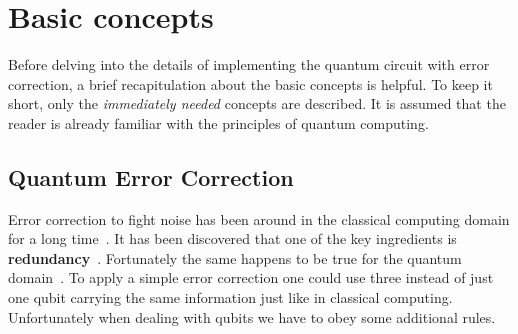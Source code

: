 \section{Basic concepts}
\label{sec:basic-concepts}

Before delving into the details of implementing the quantum circuit with error correction, a brief recapitulation about the basic concepts is helpful.
To keep it short, only the \emph{immediately needed} concepts are described.
It is assumed that the reader is already familiar with the principles of quantum computing.

\subsection{Quantum Error Correction}
\label{subsec:qec}

Error correction to fight noise has been around in the classical computing domain for a long time~\cite[p. 459]{benenti2004principles}.
It has been discovered that one of the key ingredients is \textbf{redundancy}~\cite[p. 459]{benenti2004principles}.
Fortunately the same happens to be true for the quantum domain~\cite[p. 46998]{Li}.
To apply a simple error correction one could use three instead of just one qubit carrying the same information just like in classical computing.
Unfortunately when dealing with qubits we have to obey some additional rules.

